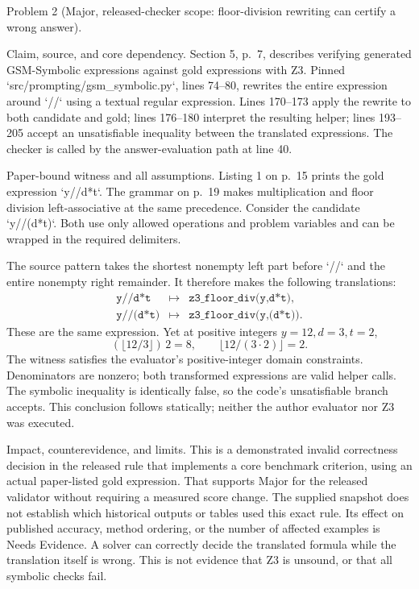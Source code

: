 \documentclass[10pt]{article}
\begin{document}
Problem 2 (Major, released-checker scope: floor-division rewriting can certify a wrong answer).\par
Claim, source, and core dependency. Section 5, p. 7, describes verifying generated GSM-Symbolic expressions against gold expressions with Z3. Pinned `src/prompting/gsm\_symbolic.py`, lines 74–80, rewrites the entire expression around `//` using a textual regular expression. Lines 170–173 apply the rewrite to both candidate and gold; lines 176–180 interpret the resulting helper; lines 193–205 accept an unsatisfiable inequality between the translated expressions. The checker is called by the answer-evaluation path at line 40.\par
Paper-bound witness and all assumptions. Listing 1 on p. 15 prints the gold expression `y//d*t`. The grammar on p. 19 makes multiplication and floor division left-associative at the same precedence. Consider the candidate `y//(d*t)`. Both use only allowed operations and problem variables and can be wrapped in the required delimiters.\par
The source pattern takes the shortest nonempty left part before `//` and the entire nonempty right remainder. It therefore makes the following translations: \[\begin{array}{rcl}
 \texttt{y//d*t}&\longmapsto&\texttt{z3\_floor\_div(y,d*t)},\\
 \texttt{y//(d*t)}&\longmapsto&\texttt{z3\_floor\_div(y,(d*t))}.
 \end{array}\] These are the same expression. Yet at positive integers \(y=12,d=3,t=2\), \[(\lfloor12/3\rfloor)\,2=8,\qquad
 \lfloor12/(3\cdot2)\rfloor=2.\] The witness satisfies the evaluator’s positive-integer domain constraints. Denominators are nonzero; both transformed expressions are valid helper calls. The symbolic inequality is identically false, so the code’s unsatisfiable branch accepts. This conclusion follows statically; neither the author evaluator nor Z3 was executed.\par
Impact, counterevidence, and limits. This is a demonstrated invalid correctness decision in the released rule that implements a core benchmark criterion, using an actual paper-listed gold expression. That supports Major for the released validator without requiring a measured score change. The supplied snapshot does not establish which historical outputs or tables used this exact rule. Its effect on published accuracy, method ordering, or the number of affected examples is Needs Evidence. A solver can correctly decide the translated formula while the translation itself is wrong. This is not evidence that Z3 is unsound, or that all symbolic checks fail.\par
\end{document}
